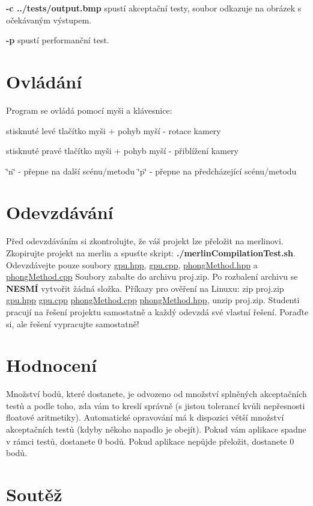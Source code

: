 \begin{DoxyItemize}
\item {\bfseries -\/c ../tests/output.bmp} spustí akceptační testy, soubor odkazuje na obrázek s očekávaným výstupem.
\item {\bfseries -\/p} spustí performanční test.
\end{DoxyItemize}\hypertarget{index_ovladani}{}\section{Ovládání}\label{index_ovladani}
Program se ovládá pomocí myši a klávesnice\+:
\begin{DoxyItemize}
\item stisknuté levé tlačítko myši + pohyb myší -\/ rotace kamery
\item stisknuté pravé tlačítko myši + pohyb myší -\/ přiblížení kamery
\item \char`\"{}n\char`\"{} -\/ přepne na další scénu/metodu \char`\"{}p\char`\"{} -\/ přepne na předcházející scénu/metodu
\end{DoxyItemize}\hypertarget{index_odevzdavani}{}\section{Odevzdávání}\label{index_odevzdavani}
Před odevzdáváním si zkontrolujte, že váš projekt lze přeložit na merlinovi. Zkopirujte projekt na merlin a spusťte skript\+: {\bfseries ./merlin\+Compilation\+Test.sh}. Odevzdávejte pouze soubory \hyperlink{gpu_8hpp}{gpu.\+hpp}, \hyperlink{gpu_8cpp}{gpu.\+cpp}, \hyperlink{phongMethod_8hpp}{phong\+Method.\+hpp} a \hyperlink{phongMethod_8cpp}{phong\+Method.\+cpp} Soubory zabalte do archivu proj.\+zip. Po rozbalení archivu se {\bfseries N\+E\+S\+MÍ} vytvořit žádná složka. Příkazy pro ověření na Linuxu\+: zip proj.\+zip \hyperlink{gpu_8hpp}{gpu.\+hpp} \hyperlink{gpu_8cpp}{gpu.\+cpp} \hyperlink{phongMethod_8cpp}{phong\+Method.\+cpp} \hyperlink{phongMethod_8hpp}{phong\+Method.\+hpp}, unzip proj.\+zip. Studenti pracují na řešení projektu samostatně a každý odevzdá své vlastní řešení. Poraďte si, ale řešení vypracujte samostatně!\hypertarget{index_hodnoceni}{}\section{Hodnocení}\label{index_hodnoceni}
Množství bodů, které dostanete, je odvozeno od množství splněných akceptačních testů a podle toho, zda vám to kreslí správně (s jistou tolerancí kvůli nepřesnosti floatové aritmetiky). Automatické opravování má k dispozici větší množství akceptačních testů (kdyby někoho napadlo je obejít). Pokud vám aplikace spadne v rámci testů, dostanete 0 bodů. Pokud aplikace nepůjde přeložit, dostanete 0 bodů.\hypertarget{index_soutez}{}\section{Soutěž}\label{index_soutez}
